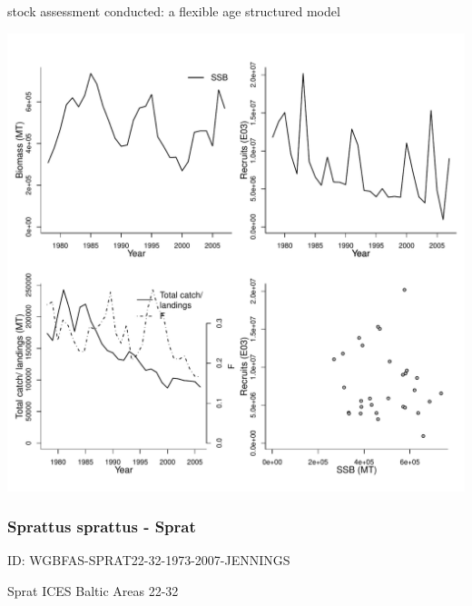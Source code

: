 stock assessment conducted: a flexible age structured model 
\begin{center}
\vspace{-0.2cm}\includegraphics[scale=0.65]{../tex/figures/plot-WGMHSA-SARDPVIIIc-IXa-1978-2007-JENNINGS.pdf}
\end{center}

\newpage
\subsubsection{Sprattus sprattus - Sprat}
ID: WGBFAS-SPRAT22-32-1973-2007-JENNINGS

Sprat ICES Baltic Areas 22-32 

